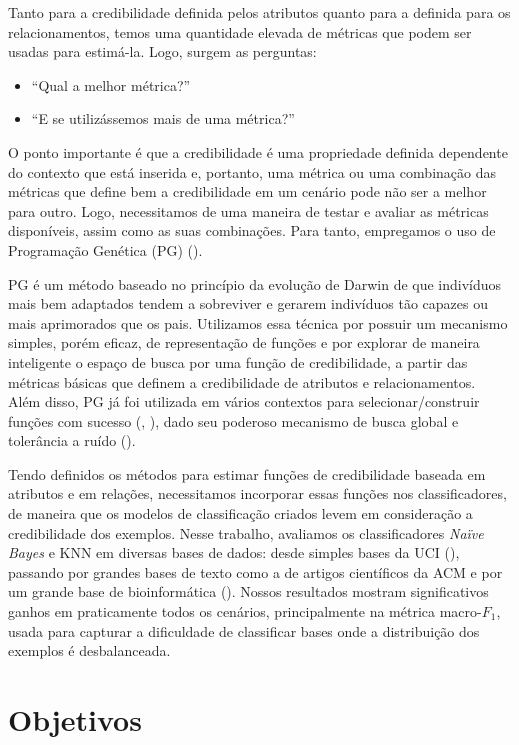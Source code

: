 Tanto para a credibilidade definida pelos atributos quanto para a definida para os relacionamentos, temos uma quantidade elevada de métricas que podem ser usadas para estimá-la. Logo, surgem as perguntas: 
\begin{itemize}
\item ``Qual a melhor métrica?''
\item ``E se utilizássemos mais de uma métrica?''
\end{itemize}
O ponto importante é que a credibilidade é uma propriedade definida dependente do contexto que está inserida e, portanto, uma métrica ou uma combinação das métricas que define bem a credibilidade em um cenário pode não ser a melhor para outro. Logo, necessitamos de uma maneira de testar e avaliar as métricas disponíveis, assim como as suas combinações. Para tanto, empregamos o uso de Programação Genética (\textsc{PG}) (\cite{Koza92}).

\textsc{PG} é um método baseado no princípio da evolução de Darwin de que indivíduos mais bem adaptados tendem a sobreviver e gerarem indivíduos tão capazes ou mais aprimorados que os pais. 
Utilizamos essa técnica por possuir um mecanismo simples, porém eficaz, de representação de funções e por explorar de maneira inteligente o espaço de busca por uma função de credibilidade, 
a partir das métricas básicas que definem a credibilidade de atributos e relacionamentos. Além disso, \textsc{PG} já foi utilizada em vários contextos para selecionar/construir funções com sucesso (\cite{Golubski02}, \cite{Freitas10}), dado seu poderoso mecanismo de busca global e tolerância a ruído (\cite{Back00}).


Tendo definidos os métodos para estimar funções de credibilidade baseada em atributos e em relações, necessitamos incorporar essas funções nos classificadores, de maneira que os modelos de classificação criados levem em consideração a credibilidade dos exemplos. Nesse trabalho, avaliamos os classificadores \textit{Naïve Bayes} e \textsc{KNN} em diversas bases de dados: desde simples bases da \textsc{UCI} (\cite{UCI98}), passando por grandes bases de texto como a de artigos científicos da \textsc{ACM} e por um grande base de bioinformática (\cite{dpires_bmc_2011}).
Nossos resultados mostram significativos ganhos em praticamente todos os cenários, principalmente na métrica macro-$F_1$, usada para capturar a dificuldade de classificar bases onde a distribuição dos exemplos é desbalanceada.


\section{Objetivos}

